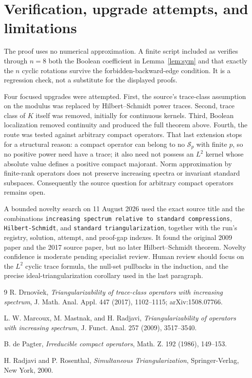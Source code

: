 \documentclass[11pt]{article}
\begin{document}
\section*{Verification, upgrade attempts, and limitations}

The proof uses no numerical approximation.  A finite script included as
 verifies through $n=8$ both the
Boolean coefficient in Lemma~\ref{lem:sym} and that exactly the $n$ cyclic
rotations survive the forbidden-backward-edge condition.  It is a regression
check, not a substitute for the displayed proofs.

Four focused upgrades were attempted.  First, the source's trace-class
assumption on the modulus was replaced by Hilbert--Schmidt power traces.
Second, trace class of $K$ itself was removed, initially for continuous
kernels.  Third, Boolean localization removed continuity and produced the
full theorem above.  Fourth, the route was tested against arbitrary compact
operators.  That last extension stops for a structural reason: a compact
operator can belong to no $\mathcal S_p$ with finite $p$, so no positive
power need have a trace; it also need not possess an $L^2$ kernel whose
absolute value defines a positive compact majorant.  Norm approximation by
finite-rank operators does not preserve increasing spectra or invariant
standard subspaces.  Consequently the source question for arbitrary compact
operators remains open.

A bounded novelty search on 11 August 2026 used the exact source title and
the combinations \texttt{increasing spectrum relative to standard
compressions}, \texttt{Hilbert-Schmidt}, and \texttt{standard
triangularization}, together with the run's registry, solution, attempt, and
proof-gap indexes.  It found the original 2009 paper \cite{MMR} and the 2017
source paper, but no later Hilbert--Schmidt theorem.  Novelty confidence is
moderate pending specialist review.  Human review should focus on the
$L^2$ cyclic trace formula, the null-set pullbacks in the induction, and the
precise ideal-triangularization corollary used in the last paragraph.

\begin{thebibliography}{9}
R. Drnov\v sek,
\emph{Triangularizability of trace-class operators with increasing spectrum},
J. Math. Anal. Appl. 447 (2017), 1102--1115; arXiv:1508.07766.

L. W. Marcoux, M. Mastnak, and H. Radjavi,
\emph{Triangularizability of operators with increasing spectrum},
J. Funct. Anal. 257 (2009), 3517--3540.

B. de Pagter,
\emph{Irreducible compact operators},
Math. Z. 192 (1986), 149--153.

H. Radjavi and P. Rosenthal,
\emph{Simultaneous Triangularization},
Springer-Verlag, New York, 2000.
\end{thebibliography}
\end{document}
